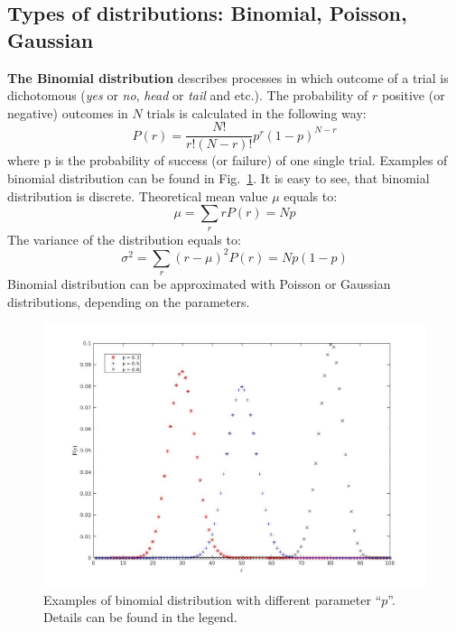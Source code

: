 \documentclass[12pt,a4paper]{report}
\begin{document}
\subsection{Types of distributions: Binomial, Poisson, Gaussian} 
\textbf{The Binomial distribution} describes processes in which outcome of a trial is dichotomous (\textit{yes} or \textit{no}, \textit{head} or \textit{tail} and etc.). The probability of $r$ positive (or negative) outcomes in $N$ trials is calculated in the following way:
\begin{equation} \label{binom_dist}
P(r) = \frac{N!}{r! (N-r)!}p^r (1-p)^{N-r}
\end{equation}
where p is the probability of success (or failure) of one single trial. Examples of binomial distribution can be found in Fig.~\ref{fig:Binom}. It is easy to see, that binomial distribution is discrete. Theoretical mean value $\mu$ equals to:
\begin{equation} \label{binom_mean_val}
\mu = \sum_r r P(r) = Np
\end{equation}
The variance of the distribution equals to:
\begin{equation} \label{binom_var}
\sigma^2 = \sum_r (r-\mu)^2P(r) = Np(1-p)
\end{equation}
Binomial distribution can be approximated with Poisson or Gaussian distributions, depending on the parameters. 
\begin{figure}[!h]
\begin{center}
\includegraphics*[scale = 0.5]{Figures/Binom}
\caption{\label{fig:Binom} Examples of binomial distribution with different parameter \enquote{$p$}. Details can be found in the legend.}
\end{center}
\end{figure}
\end{document}
